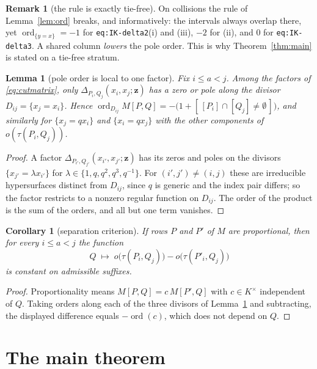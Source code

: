 \documentclass[11pt]{article}
\theoremstyle{plain}
\newtheorem{lem}[thm]{Lemma}
\newtheorem{cor}[thm]{Corollary}
\theoremstyle{definition}
\newtheorem{rem}[thm]{Remark}
\DeclareMathOperator{\ord}{ord}
\newcommand{\Dl}{\Delta}
\newcommand{\bz}{\bm{z}}
\begin{document}
\begin{rem}[the rule is exactly tie-free]
On collisions the rule of Lemma~\ref{lem:ord} breaks, and informatively: the
intervals always overlap there, yet
$\ord_{\{y=x\}}=-1$ for \texttt{eq:IK-delta2}(i) and (iii), $-2$ for (ii), and
$0$ for \texttt{eq:IK-delta3}. A shared column \emph{lowers} the pole order.
This is why Theorem~\ref{thm:main} is stated on a tie-free stratum.
\end{rem}

\begin{lem}[pole order is local to one factor]\label{lem:local}
Fix $i\le a<j$. Among the factors of \eqref{eq:cutmatrix}, only
$\Dl_{P_i,Q_j}(x_i,x_j;\bz)$ has a zero or pole along the divisor
$D_{ij}=\{x_j=x_i\}$. Hence
$\ord_{D_{ij}}M[P,Q]=-\bigl(1+[\,[P_i]\cap[Q_j]\neq\emptyset\,]\bigr)$, and
similarly for $\{x_j=qx_i\}$ and $\{x_i=qx_j\}$ with the other components of
$o(\tau(P_i,Q_j))$.
\end{lem}

\begin{proof}
A factor $\Dl_{P_{i'},Q_{j'}}(x_{i'},x_{j'};\bz)$ has its zeros and poles on the
divisors $\{x_{j'}=\lambda x_{i'}\}$ for $\lambda\in\{1,q,q^{2},q^{3},q^{-1}\}$.
For $(i',j')\neq(i,j)$ these are irreducible hypersurfaces distinct from
$D_{ij}$, since $q$ is generic and the index pair differs; so the factor
restricts to a nonzero regular function on $D_{ij}$. The order of the product is
the sum of the orders, and all but one term vanishes.
\end{proof}

\begin{cor}[separation criterion]\label{cor:sep}
If rows $P$ and $P'$ of $M$ are proportional, then for every $i\le a<j$ the
function
\[
Q\;\longmapsto\; o\bigl(\tau(P_i,Q_j)\bigr)-o\bigl(\tau(P'_i,Q_j)\bigr)
\]
is constant on admissible suffixes.
\end{cor}

\begin{proof}
Proportionality means $M[P,Q]=c\,M[P',Q]$ with $c\in K^{\times}$ independent of
$Q$. Taking orders along each of the three divisors of Lemma~\ref{lem:local} and
subtracting, the displayed difference equals $-\ord(c)$, which does not depend
on $Q$.
\end{proof}

\section{The main theorem}
\label{sec:main}
\end{document}
